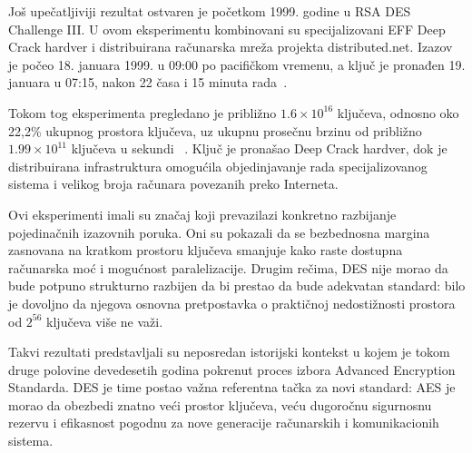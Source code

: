 Još upečatljiviji rezultat ostvaren je početkom 1999. godine u
RSA DES Challenge III. U ovom eksperimentu kombinovani su
specijalizovani EFF Deep Crack hardver i distribuirana računarska
mreža projekta distributed.net. Izazov je počeo 18. januara 1999. u
09:00 po pacifičkom vremenu, a ključ je pronađen 19. januara u 07:15,
nakon
22 časa i 15 minuta
rada~\cite{distributed-des-iii-1999}.

Tokom tog eksperimenta pregledano je približno
$1.6\times 10^{16}$ ključeva, odnosno oko 22,2\% ukupnog prostora
ključeva, uz ukupnu prosečnu brzinu od približno
$1.99\times10^{11}$ ključeva u sekundi
~\cite{distributed-des-iii-1999}. Ključ je pronašao Deep Crack
hardver, dok je distribuirana infrastruktura omogućila objedinjavanje
rada specijalizovanog sistema i velikog broja računara povezanih preko
Interneta.

Ovi eksperimenti imali su značaj koji prevazilazi konkretno razbijanje
pojedinačnih izazovnih poruka. Oni su pokazali da se bezbednosna
margina zasnovana na kratkom prostoru ključeva smanjuje kako raste
dostupna računarska moć i mogućnost paralelizacije. Drugim rečima,
DES nije morao da bude potpuno strukturno razbijen da bi prestao da
bude adekvatan standard: bilo je dovoljno da njegova osnovna
pretpostavka o praktičnoj nedostižnosti prostora od $2^{56}$ ključeva
više ne važi.

Takvi rezultati predstavljali su neposredan istorijski kontekst u
kojem je tokom druge polovine devedesetih godina pokrenut proces
izbora Advanced Encryption Standarda. DES je time postao važna
referentna tačka za novi standard: AES je morao da obezbedi znatno
veći prostor ključeva, veću dugoročnu sigurnosnu rezervu i efikasnost
pogodnu za nove generacije računarskih i komunikacionih sistema.